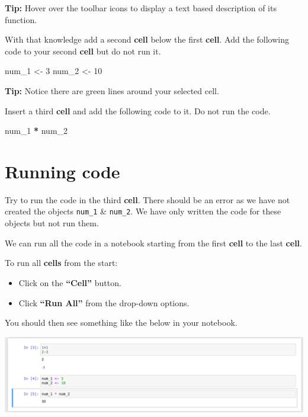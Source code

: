 \documentclass[
]{book}
\newenvironment{Shaded}{\begin{snugshade}}{\end{snugshade}}
\newcommand{\DecValTok}[1]{\textcolor[rgb]{0.00,0.00,0.81}{#1}}
\newcommand{\NormalTok}[1]{#1}
\newcommand{\OtherTok}[1]{\textcolor[rgb]{0.56,0.35,0.01}{#1}}
\newcommand{\SpecialCharTok}[1]{\textcolor[rgb]{0.81,0.36,0.00}{\textbf{#1}}}
\providecommand{\tightlist}{%
  \setlength{\itemsep}{0pt}\setlength{\parskip}{0pt}}
\begin{document}
\textbf{Tip:} Hover over the toolbar icons to display a text based description of its function.

With that knowledge add a second \textbf{cell} below the first \textbf{cell}. Add the following code to your second \textbf{cell} but do not run it.

\begin{Shaded}
\begin{Highlighting}[]
\NormalTok{num\_1 }\OtherTok{\textless{}{-}} \DecValTok{3}
\NormalTok{num\_2 }\OtherTok{\textless{}{-}} \DecValTok{10}
\end{Highlighting}
\end{Shaded}

\textbf{Tip:} Notice there are green lines around your selected cell.

Insert a third \textbf{cell} and add the following code to it. Do not run the code.

\begin{Shaded}
\begin{Highlighting}[]
\NormalTok{num\_1 }\SpecialCharTok{*}\NormalTok{ num\_2}
\end{Highlighting}
\end{Shaded}

\hypertarget{running-code}{%
\section{Running code}\label{running-code}}

Try to run the code in the third \textbf{cell}. There should be an error as we have not created the objects \texttt{num\_1} \& \texttt{num\_2}. We have only written the code for these objects but not run them.

We can run all the code in a notebook starting from the first \textbf{cell} to the last \textbf{cell}.

To run all \textbf{cells} from the start:

\begin{itemize}
\tightlist
\item
  Click on the \textbf{``Cell''} button.
\item
  Click \textbf{``Run All''} from the drop-down options.
\end{itemize}

You should then see something like the below in your notebook.

\includegraphics{figures/jupyter_notebook_example_4.png}
\end{document}
